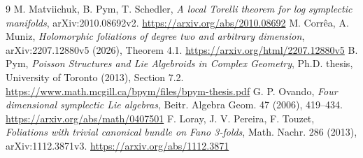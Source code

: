 \documentclass[11pt,a4paper]{ltjsarticle}
\theoremstyle{remark}\newtheorem{remark}[theorem]{注意}\renewcommand{\proofname}{証明}
\begin{document}
\begin{thebibliography}{9}
 M. Matviichuk, B. Pym, T. Schedler,
\emph{A local Torelli theorem for log symplectic manifolds}, arXiv:2010.08692v2.
\url{https://arxiv.org/abs/2010.08692}
 M. Corr\^ea, A. Muniz,
\emph{Holomorphic foliations of degree two and arbitrary dimension}, arXiv:2207.12880v5 (2026), Theorem 4.1.
\url{https://arxiv.org/html/2207.12880v5}
 B. Pym,
\emph{Poisson Structures and Lie Algebroids in Complex Geometry}, Ph.D. thesis, University of Toronto (2013), Section 7.2.
\url{https://www.math.mcgill.ca/bpym/files/bpym-thesis.pdf}
 G. P. Ovando,
\emph{Four dimensional symplectic Lie algebras}, Beitr. Algebra Geom. 47 (2006), 419--434.
\url{https://arxiv.org/abs/math/0407501}
 F. Loray, J. V. Pereira, F. Touzet,
\emph{Foliations with trivial canonical bundle on Fano 3-folds}, Math. Nachr. 286 (2013), arXiv:1112.3871v3.
\url{https://arxiv.org/abs/1112.3871}
\end{thebibliography}
\end{document}
